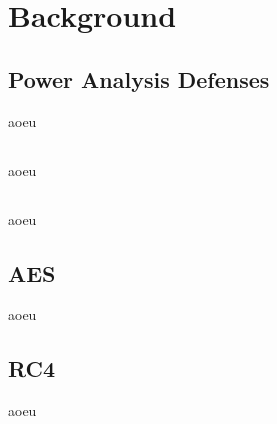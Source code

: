 \section{Background}
\label{background}
\subsection{Power Analysis Defenses}
aoeu

\subsection{\llvm{}}
aoeu

\subsection{\qemu{}}
aoeu

\subsection{AES}
aoeu

\subsection{RC4}
aoeu
